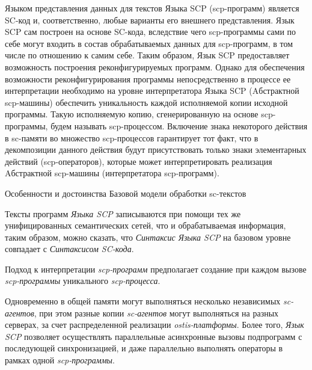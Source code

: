\begin{frame}{}
\topline
\justifying
\vspace{10mm}

Языком представления данных для текстов Языка SCP (scp-программ) является SC-код и, соответственно, любые варианты его внешнего представления. Язык SCP сам построен на основе SC-кода, вследствие чего scp-программы сами по себе могут входить в состав обрабатываемых данных для scp-программ, в том числе по отношению к самим себе. Таким образом, Язык SCP предоставляет возможность построения реконфигурируемых программ. Однако для обеспечения возможности реконфигурирования программы непосредственно в процессе ее интерпретации необходимо на уровне интерпретатора Языка SCP (Aбстрактной scp-машины) обеспечить уникальность каждой исполняемой копии исходной программы. Такую исполняемую копию, сгенерированную на основе scp-программы, будем называть scp-процессом. Включение знака некоторого действия в sc-памяти во множество scp-процессов гарантирует тот факт, что в декомпозиции данного действия будут присутствовать только знаки элементарных действий (scp-операторов), которые может интерпретировать реализация Aбстрактной scp-машины (интерпретатора scp-программ).
\end{frame}

\begin{frame}{Особенности и достоинства Базовой модели обработки sc-текстов}
\topline
\justifying
\vspace{10mm}

\begin{textitemize}
    \item Тексты программ \textit{Языка SCP} записываются при помощи тех же унифицированных семантических сетей, что и обрабатываемая информация, таким образом, можно сказать, что \textit{Синтаксис Языка SCP} на базовом уровне совпадает с \textit{Синтаксисом SC-кода}.
    \item Подход к интерпретации \textit{scp-программ} предполагает создание при каждом вызове \textit{scp-программы} уникального \textit{scp-процесса}.
    \item Одновременно в общей памяти могут выполняться несколько независимых \textit{sc-агентов}, при этом разные копии \textit{sc-агентов} могут выполняться на разных серверах, за счет распределенной реализации \textit{ostis-платформы}. Более того, \textit{Язык SCP} позволяет осуществлять параллельные асинхронные вызовы подпрограмм с последующей синхронизацией, и даже параллельно	выполнять операторы в рамках одной \textit{scp-программы}.
    \end{textitemize}
\end{frame}

